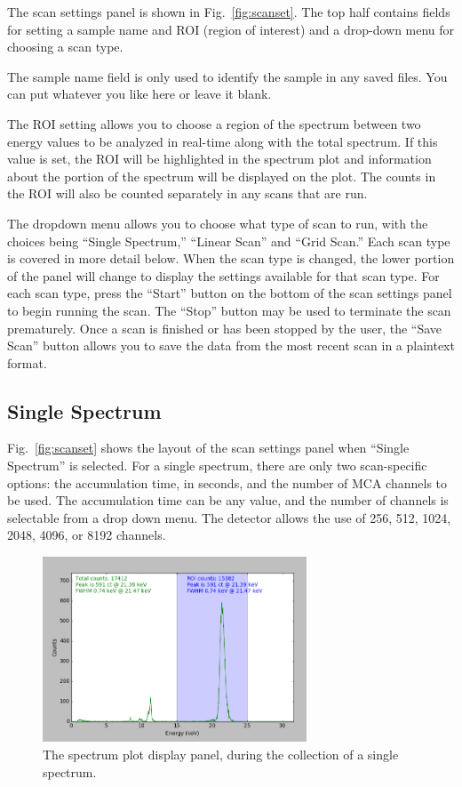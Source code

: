 The scan settings panel is shown in Fig.~\ref{fig:scanset}. The top half contains fields for setting a sample name and ROI (region of interest) and a drop-down menu for choosing a scan type.

The sample name field is only used to identify the sample in any saved files. You can put whatever you like here or leave it blank.

The ROI setting allows you to choose a region of the spectrum between two energy values to be analyzed in real-time along with the total spectrum. If this value is set, the ROI will be highlighted in the spectrum plot and information about the portion of the spectrum will be displayed on the plot. The counts in the ROI will also be counted separately in any scans that are run.

The dropdown menu allows you to choose what type of scan to run, with the choices being ``Single Spectrum,'' ``Linear Scan'' and ``Grid Scan.'' Each scan type is covered in more detail below. When the scan type is changed, the lower portion of the panel will change to display the settings available for that scan type.
For each scan type, press the ``Start'' button on the bottom of the scan settings panel to begin running the scan. The ``Stop'' button may be used to terminate the scan prematurely. Once a scan is finished or has been stopped by the user, the ``Save Scan'' button allows you to save the data from the most recent scan in a plaintext format.

\subsection{Single Spectrum}

Fig.~\ref{fig:scanset} shows the layout of the scan settings panel when ``Single Spectrum'' is selected. For a single spectrum, there are only two scan-specific options: the accumulation time, in seconds, and the number of MCA channels to be used. The accumulation time can be any value, and the number of channels is selectable from a drop down menu. The detector allows the use of 256, 512, 1024, 2048, 4096, or 8192 channels.

\begin{figure}
\centering
\includegraphics[width=0.7\textwidth]{specplot.png}
\caption{\label{fig:specplot} The spectrum plot display panel, during the collection of a single spectrum.}
\end{figure}

